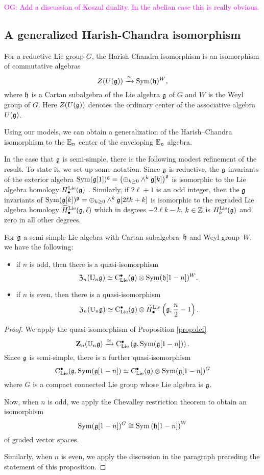 \documentclass[11pt]{amsart}
\numberwithin{equation}{section}
\def\owen{\textcolor{magenta}{OG: }\textcolor{magenta}}
\begin{document}
\owen{Add a discussion of Koszul duality. In the abelian case this is really obvious.}

\subsection{A generalized Harish-Chandra isomorphism}

For a reductive Lie group $G$, the Harish-Chandra isomorphism is an isomorphism of commutative algebras
\[
Z(U(\mathfrak g)) \xrightarrow{\cong} {\rm Sym} (\mathfrak h)^W,
\]
where $\mathfrak h$ is a Cartan subalgebra of the Lie algebra $\mathfrak g$ of $G$ and $W$ is the Weyl group of $G$. 
Here $Z(U(\mathfrak g))$ denotes the ordinary center of the associative algebra~$U(\mathfrak g)$. 

Using our models, we can obtain a generalization of the Harish--Chandra isomorphism to the $\mathbb E_n$ center of the  enveloping $\mathbb E_n$ algebra. 

In the case that $\mathfrak g$ is semi-simple, there is the following modest refinement of the result. 
To state it, we set up some notation. 
Since $\mathfrak g$ is reductive, the $\mathfrak g$-invariants of the exterior algebra ${\rm Sym}(\mathfrak g[1])^\mathfrak g = \left(\oplus_{k \geq 0} \wedge^k \mathfrak g[k]\right)^\mathfrak g$ is isomorphic to the Lie algebra homology $H^{\rm Lie}_\bullet(\mathfrak g)$ \cite{Cartan}.
Similarly, if $2\ell+1$ is an odd integer, then the $\mathfrak g$ invariants of ${\rm Sym}(\mathfrak g[k])^\mathfrak g = \oplus_{k \geq 0} \wedge^k \mathfrak g[2 \ell k + k]$ is isomorphic to the regraded Lie algebra homology $\widetilde{H}_\bullet^{\rm Lie} (\mathfrak g, \ell)$
which in degrees $-2\ell k - k$, $k \in \mathbb Z$ is $H_{k}^{\rm Lie}(\mathfrak g)$ and zero in all other degrees.

\begin{prp}
For $\mathfrak g$ a semi-simple Lie algebra with Cartan subalgebra~$\mathfrak h$ and Weyl group~$W$, we have the following:
\begin{itemize}
\item if $n$ is odd, then there is a quasi-isomorphism 
\[
{\frak Z}_n(\mathbb U_n \mathfrak g) \simeq {\rm C}_{\rm Lie}^\bullet (\mathfrak g) \otimes {\rm Sym}(\mathfrak h[1-n])^W.
\]
\item if $n$ is even, then there is a quasi-isomorphism 
\[
{\frak Z}_n(\mathbb U_n \mathfrak g) \simeq {\rm C}_{\rm Lie}^\bullet (\mathfrak g) \otimes \widetilde{H}_\bullet^{\rm Lie} \left(\mathfrak g, \frac{n}{2} -1\right).
\]
\end{itemize}
\end{prp}
\begin{proof}
We apply the quasi-isomorphism of Proposition \ref{prop:def}
\[
\mathbf Z_n(\mathbb U_n \mathfrak g) \xrightarrow{\simeq} {\rm C}_{\rm Lie}^\bullet\left(\mathfrak g, {\rm Sym}(\mathfrak g[1-n]) \right) .
\]
Since $\mathfrak g$ is semi-simple, there is a further quasi-isomorphism
\[
{\rm C}_{\rm Lie}^\bullet(\mathfrak g, {\rm Sym}(\mathfrak g[1-n]) \simeq {\rm C}_{\rm Lie}^\bullet (\mathfrak g) \otimes {\rm Sym}(\mathfrak g[1-n])^G 
\]
where $G$ is a compact connected Lie group whose Lie algebra is $\mathfrak g$. 

Now, when $n$ is odd, we apply the Chevalley restriction theorem to obtain an isomorphism 
\[
{\rm Sym}(\mathfrak g[1-n])^G \cong {\rm Sym} \left(\mathfrak h[1-n]\right)^W 
\]
of graded vector spaces.

Similarly, when $n$ is even, we apply the discussion in the paragraph preceding the statement of this proposition.
\end{proof}
\end{document}
